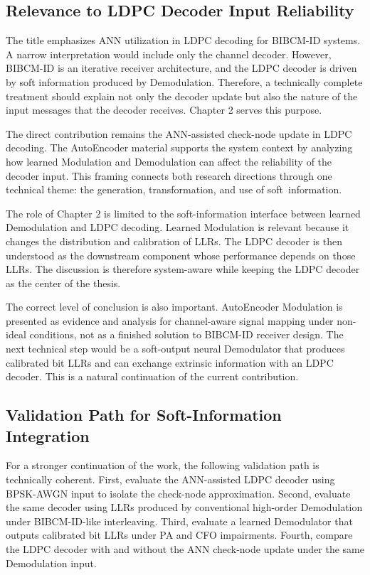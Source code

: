 \subsection{Relevance to LDPC Decoder Input Reliability}
The title emphasizes ANN utilization in LDPC decoding for BIBCM-ID systems. A narrow interpretation would include only the channel decoder. However, BIBCM-ID is an iterative receiver architecture, and the LDPC decoder is driven by soft information produced by Demodulation. Therefore, a technically complete treatment should explain not only the decoder update but also the nature of the input messages that the decoder receives. Chapter 2 serves this purpose.

The direct contribution remains the ANN-assisted check-node update in LDPC decoding. The AutoEncoder material supports the system context by analyzing how learned Modulation and Demodulation can affect the reliability of the decoder input. This framing connects both research directions through one technical theme: the generation, transformation, and use of soft~information.

The role of Chapter 2 is limited to the soft-information interface between learned Demodulation and LDPC decoding. Learned Modulation is relevant because it changes the distribution and calibration of LLRs. The LDPC decoder is then understood as the downstream component whose performance depends on those LLRs. The discussion is therefore system-aware while keeping the LDPC decoder as the center of the thesis.

The correct level of conclusion is also important. AutoEncoder Modulation is presented as evidence and analysis for channel-aware signal mapping under non-ideal conditions, not as a finished solution to BIBCM-ID receiver design. The next technical step would be a soft-output neural Demodulator that produces calibrated bit LLRs and can exchange extrinsic information with an LDPC decoder. This is a natural continuation of the current contribution.

\subsection{Validation Path for Soft-Information Integration}
For a stronger continuation of the work, the following validation path is technically coherent. First, evaluate the ANN-assisted LDPC decoder using BPSK-AWGN input to isolate the check-node approximation. Second, evaluate the same decoder using LLRs produced by conventional high-order Demodulation under BIBCM-ID-like interleaving. Third, evaluate a learned Demodulator that outputs calibrated bit LLRs under PA and CFO impairments. Fourth, compare the LDPC decoder with and without the ANN check-node update under the same Demodulation input.

